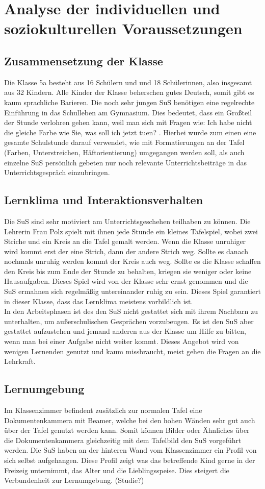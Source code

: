 \chapter{Analyse der individuellen und soziokulturellen Voraussetzungen}

\section{Zusammensetzung der Klasse}
Die Klasse 5a besteht aus 16 Schülern und und 18 Schülerinnen, also insgesamt aus 32 Kindern. Alle Kinder der Klasse beherschen gutes Deutsch, somit gibt es kaum sprachliche Barieren. Die noch sehr jungen SuS benötigen eine regelrechte Einführung in das Schulleben am Gymnasium. Dies bedeutet, dass ein Großteil der Stunde verlohren gehen kann, weil man sich mit Fragen wie: \glqq Ich habe nicht die gleiche Farbe wie Sie, was soll ich jetzt tuen? \grqq. Hierbei wurde zum einen eine gesamte Schulstunde darauf verwendet, wie mit Formatierungen an der Tafel (Farben, Unterstreichen, Häftorientierung) umgegangen werden soll, als auch einzelne SuS persönlich gebeten nur noch relevante Unterrichtsbeiträge in das Unterrichtsgespräch einzubringen.\\
\section{Lernklima und Interaktionsverhalten}
Die SuS sind sehr motiviert am Unterrichtsgeschehen teilhaben zu können. Die Lehrerin Frau Polz spielt mit ihnen jede Stunde ein kleines Tafelspiel, wobei zwei Striche und ein Kreis an die Tafel gemalt werden. Wenn die Klasse unruhiger wird kommt erst der eine Strich, dann der andere Strich weg. Sollte es danach nochmals unruhig werden kommt der Kreis auch weg. Sollte es die Klasse schaffen den Kreis bis zum Ende der Stunde zu behalten, kriegen sie weniger oder keine Hausaufgaben. Dieses Spiel wird von der Klasse sehr ernst genommen und die SuS ermahnen sich regelmäßig untereinander ruhig zu sein. Dieses Spiel garantiert in dieser Klasse, dass das Lernklima meistens vorbildlich ist. \\
In den Arbeitsphasen ist des den SuS nicht gestattet sich mit ihrem Nachbarn zu unterhalten, um außerschulischen Gesprächen vorzubeugen. Es ist den SuS aber gestattet aufzustehen und jemand anderen aus der Klasse um Hilfe zu bitten, wenn man bei einer Aufgabe nicht weiter kommt. Dieses Angebot wird von wenigen Lernenden genutzt und kaum missbraucht, meist gehen die Fragen an die Lehrkraft. 
\section {Lernumgebung}
Im Klassenzimmer befindent zusätzlich zur normalen Tafel eine Dokumentenkammera mit Beamer, welche bei den hohen Wänden sehr gut auch über der Tafel genutzt werden kann. Somit können Bilder oder Ähnliches über die Dokumentenkammera gleichzeitig mit dem Tafelbild den SuS vorgeführt werden. Die SuS haben an der hinteren Wand vom Klassenzimmer ein Profil von sich selbst aufgehangen. Diese Profil zeigt was das betreffende Kind gerne in der Freizeig unternimmt, das Alter und die Lieblingsspeise. Dies steigert die Verbundenheit zur Lernumgebung. (Studie?)